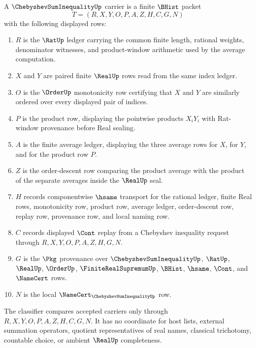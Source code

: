 \begin{definition}
\label{def:chebyshev-sum-inequality-carrier}
A $\ChebyshevSumInequalityUp$ carrier is a finite $\BHist$ packet
$$
T=(R,X,Y,O,P,A,Z,H,C,G,N)
$$
with the following displayed rows:
\begin{enumerate}
\item $R$ is the $\RatUp$ ledger carrying the common finite length, rational weights, denominator witnesses, and product-window arithmetic used by the average computation.
\item $X$ and $Y$ are paired finite $\RealUp$ rows read from the same index ledger.
\item $O$ is the $\OrderUp$ monotonicity row certifying that $X$ and $Y$ are similarly ordered over every displayed pair of indices.
\item $P$ is the product row, displaying the pointwise products $X_{i}Y_{i}$ with Rat-window provenance before Real sealing.
\item $A$ is the finite average ledger, displaying the three average rows for $X$, for $Y$, and for the product row $P$.
\item $Z$ is the order-descent row comparing the product average with the product of the separate averages inside the $\RealUp$ seal.
\item $H$ records componentwise $\hsame$ transport for the rational ledger, finite Real rows, monotonicity row, product row, average ledger, order-descent row, replay row, provenance row, and local naming row.
\item $C$ records displayed $\Cont$ replay from a Chebyshev inequality request through $R,X,Y,O,P,A,Z,H,G,N$.
\item $G$ is the $\Pkg$ provenance over $\ChebyshevSumInequalityUp$, $\RatUp$, $\RealUp$, $\OrderUp$, $\FiniteRealSupremumUp$, $\BHist$, $\hsame$, $\Cont$, and $\NameCert$ rows.
\item $N$ is the local $\NameCert_{\ChebyshevSumInequalityUp}$ row.
\end{enumerate}
The classifier compares accepted carriers only through $R,X,Y,O,P,A,Z,H,C,G,N$. It has no coordinate for host lists, external summation operators, quotient representatives of real names, classical trichotomy, countable choice, or ambient $\RealUp$ completeness.
\end{definition}

